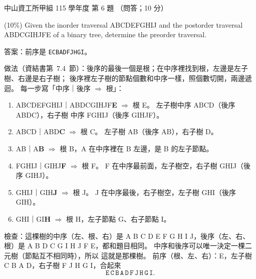 \begin{pastexam}[label={px:nsysu-115-osds-02}]{中山資工所甲組 115 學年度 第 6 題}
（問答；10 分）

(10\%) Given the inorder traversal ABCDEFGHIJ and the postorder traversal ABDCGIHJFE of a binary
tree, determine the preorder traversal.
\end{pastexam}

\begin{pastsoln}
答案：前序是 \texttt{ECBADFJHGI}。

做法（資結書第~7.4~節）：後序的最後一個是根；在中序裡找到根，左邊是左子樹、右邊是右子樹；
後序裡左子樹的節點個數和中序一樣，照個數切開，兩邊遞迴。 每一步寫「中序｜後序 $\Rightarrow$ 根」：
\begin{enumerate}
\item ABCDEFGHIJ｜ABDCGIHJF\textbf{E} $\Rightarrow$ 根 E。 左子樹中序 ABCD（後序 ABDC），右子樹
中序 FGHIJ（後序 GIHJF）。
\item ABCD｜ABD\textbf{C} $\Rightarrow$ 根 C。 左子樹 AB（後序 AB），右子樹 D。
\item AB｜A\textbf{B} $\Rightarrow$ 根 B，A 在中序裡在 B 左邊，是 B 的左子節點。
\item FGHIJ｜GIHJ\textbf{F} $\Rightarrow$ 根 F。 F 在中序最前面，左子樹空，右子樹 GHIJ（後序 GIHJ）。
\item GHIJ｜GIH\textbf{J} $\Rightarrow$ 根 J。 J 在中序最後，右子樹空，左子樹 GHI（後序 GIH）。
\item GHI｜GI\textbf{H} $\Rightarrow$ 根 H，左子節點 G、右子節點 I。
\end{enumerate}
\begin{center}
\end{center}
檢查：這棵樹的中序（左、根、右）是 A B C D E F G H I J，後序（左、右、根）是
A B D C G I H J F E，都和題目相同。 中序和後序可以唯一決定一棵二元樹（節點互不相同時），所以
這就是那棵樹。 前序（根、左、右）：E，左子樹 C B A D，右子樹 F J H G I，合起來
\[
\mathtt{E\,C\,B\,A\,D\,F\,J\,H\,G\,I}.
\]
\end{pastsoln}
